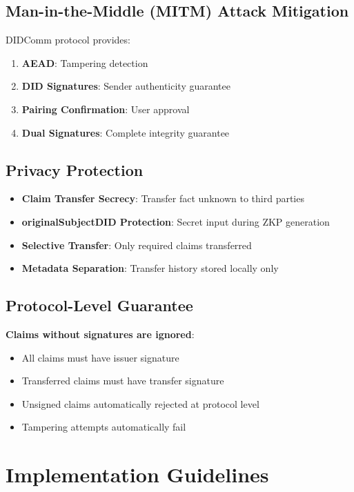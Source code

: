 \subsection{Man-in-the-Middle (MITM) Attack Mitigation}

DIDComm protocol provides:

\begin{enumerate}
  \item \textbf{AEAD}: Tampering detection
  \item \textbf{DID Signatures}: Sender authenticity guarantee
  \item \textbf{Pairing Confirmation}: User approval
  \item \textbf{Dual Signatures}: Complete integrity guarantee
\end{enumerate}

\subsection{Privacy Protection}

\begin{itemize}
  \item \textbf{Claim Transfer Secrecy}: Transfer fact unknown to third parties
  \item \textbf{originalSubjectDID Protection}: Secret input during ZKP generation
  \item \textbf{Selective Transfer}: Only required claims transferred
  \item \textbf{Metadata Separation}: Transfer history stored locally only
\end{itemize}

\subsection{Protocol-Level Guarantee}

\textbf{Claims without signatures are ignored}:
\begin{itemize}
  \item All claims must have issuer signature
  \item Transferred claims must have transfer signature
  \item Unsigned claims automatically rejected at protocol level
  \item Tampering attempts automatically fail
\end{itemize}

\section{Implementation Guidelines}

